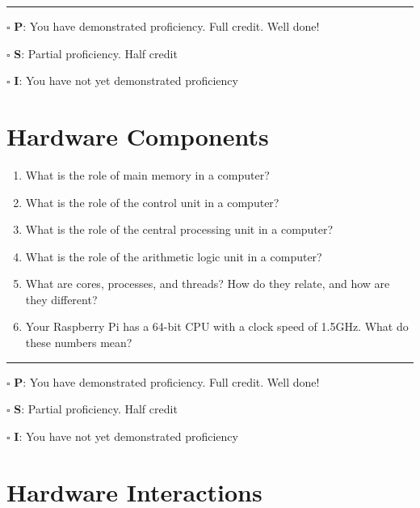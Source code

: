 \documentclass[12pt]{article}
\begin{document}
\vfill

\rule[1ex]{\textwidth}{.1pt}

$\square$ \textbf{P}: You have demonstrated proficiency. Full credit. Well done!

$\square$ \textbf{S}: Partial proficiency. Half credit

$\square$ \textbf{I}: You have not yet demonstrated proficiency

\newpage



\section*{Hardware Components}

\begin{enumerate}
\item What is the role of main memory in a computer?
\vfill

\item What is the role of the control unit in a computer?
\vfill

\item What is the role of the central processing unit in a computer?
\vfill

\item What is the role of the arithmetic logic unit in a computer?
\vfill

\item What are cores, processes, and threads? How do they relate, and how are they different?
\vfill

\item Your Raspberry Pi has a 64-bit CPU with a clock speed of 1.5GHz. What do these numbers mean?
\end{enumerate}

\vfill

\rule[1ex]{\textwidth}{.1pt}

$\square$ \textbf{P}: You have demonstrated proficiency. Full credit. Well done!

$\square$ \textbf{S}: Partial proficiency. Half credit

$\square$ \textbf{I}: You have not yet demonstrated proficiency

\newpage



\section*{Hardware Interactions}
\end{document}
